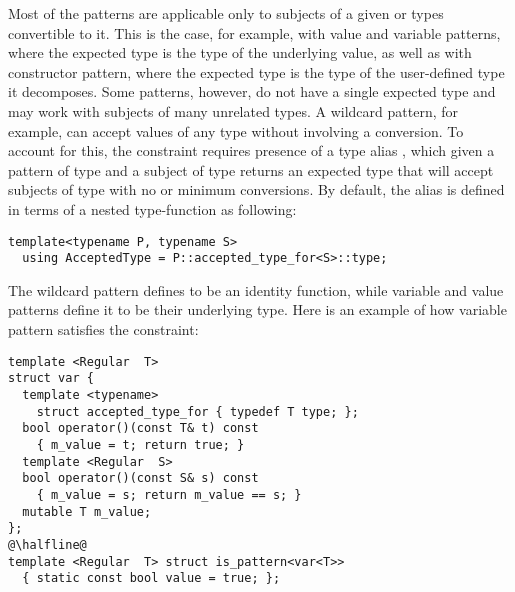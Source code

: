 Most of the patterns are applicable only to subjects of a given  
or types convertible to it. This is the case, for example, with value and  
variable patterns, where the expected type is the type of the underlying value, 
as well as with constructor pattern, where the expected type is the type of the 
user-defined type it decomposes. Some patterns, however, do not have a single 
expected type and may work with subjects of many unrelated types. A wildcard 
pattern, for example, can accept values of any type without involving a 
conversion. To account for this, the  constraint requires presence of 
a type alias , which given a pattern of type  and 
a subject of type  returns an expected type  
that will accept subjects of type  with no or minimum conversions. 
By default, the alias is defined in terms of a nested type-function 
 as following:

\begin{lstlisting}
template<typename P, typename S>
  using AcceptedType = P::accepted_type_for<S>::type;
\end{lstlisting}

\noindent
The wildcard pattern defines  to be an identity 
function, while variable and value patterns define it to be their underlying 
type. Here is an example of how variable pattern satisfies the  
constraint:

\begin{lstlisting}
template <Regular  T>
struct var {
  template <typename> 
    struct accepted_type_for { typedef T type; };
  bool operator()(const T& t) const 
    { m_value = t; return true; }
  template <Regular  S> 
  bool operator()(const S& s) const
    { m_value = s; return m_value == s; }
  mutable T m_value;
};
@\halfline@
template <Regular  T> struct is_pattern<var<T>> 
  { static const bool value = true; };
\end{lstlisting}

